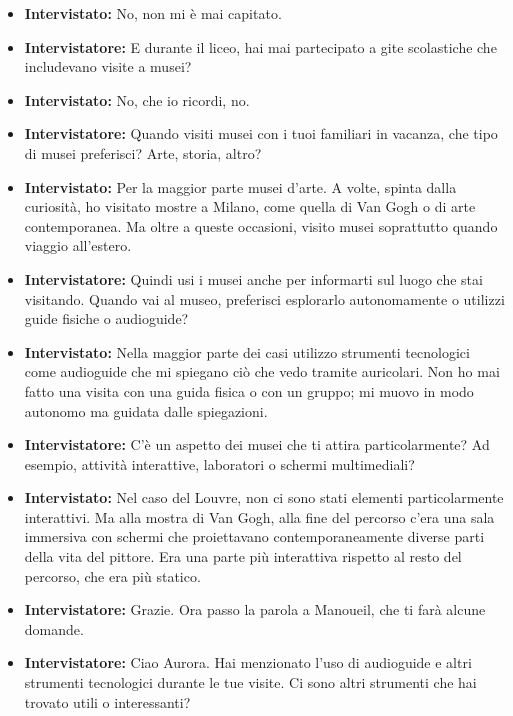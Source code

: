 \documentclass{article}
\begin{document}
\begin{itemize}
    \item \textbf{Intervistato:} No, non mi è mai capitato.
    
    \item \textbf{Intervistatore:} E durante il liceo, hai mai partecipato a gite scolastiche che includevano visite a musei?
    
    \item \textbf{Intervistato:} No, che io ricordi, no.
    
    \item \textbf{Intervistatore:} Quando visiti musei con i tuoi familiari in vacanza, che tipo di musei preferisci? Arte, storia, altro?
    
    \item \textbf{Intervistato:} Per la maggior parte musei d’arte. A volte, spinta dalla curiosità, ho visitato mostre a Milano, come quella di Van Gogh o di arte contemporanea. Ma oltre a queste occasioni, visito musei soprattutto quando viaggio all’estero.
    
    \item \textbf{Intervistatore:} Quindi usi i musei anche per informarti sul luogo che stai visitando. Quando vai al museo, preferisci esplorarlo autonomamente o utilizzi guide fisiche o audioguide?
    
    \item \textbf{Intervistato:} Nella maggior parte dei casi utilizzo strumenti tecnologici come audioguide che mi spiegano ciò che vedo tramite auricolari. Non ho mai fatto una visita con una guida fisica o con un gruppo; mi muovo in modo autonomo ma guidata dalle spiegazioni.
    
    \item \textbf{Intervistatore:} C’è un aspetto dei musei che ti attira particolarmente? Ad esempio, attività interattive, laboratori o schermi multimediali?
    
    \item \textbf{Intervistato:} Nel caso del Louvre, non ci sono stati elementi particolarmente interattivi. Ma alla mostra di Van Gogh, alla fine del percorso c’era una sala immersiva con schermi che proiettavano contemporaneamente diverse parti della vita del pittore. Era una parte più interattiva rispetto al resto del percorso, che era più statico.
    
    \item \textbf{Intervistatore:} Grazie. Ora passo la parola a Manoueil, che ti farà alcune domande.
    
    \item \textbf{Intervistatore:} Ciao Aurora. Hai menzionato l’uso di audioguide e altri strumenti tecnologici durante le tue visite. Ci sono altri strumenti che hai trovato utili o interessanti?
    

\end{itemize}
\end{document}
